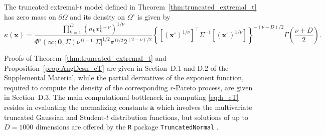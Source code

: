 \documentclass[12pt]{article}
\begin{document}
%
%
\begin{proposition}
\label{prop:AngDesn_eT}
The truncated extremal-$t$ model defined in Theorem~\ref{thm:truncated_extremal_t} has zero mass on $\partial\Omega$ and its density on $\Omega^\circ$ is given by
%
\begin{equation}
\label{eq:h_eT}
\kappa(\bm x) = \frac{\prod_{k=1}^D \left(a_k x_k^{1-\nu}\right)^{1/\nu}}{\Phi^\circ(\bm \infty;\bm 0, \Sigma) \nu^{D-1}|\Sigma|^{1/2}\pi^{D/2}2^{(2-\nu)/2}} \left\{\left[(\bm x^\circ)^{1/\nu}\right]^\top \Sigma^{-1}\left[(\bm x^\circ)^{1/\nu}\right]\right\}^{-(\nu+D)/2} \Gamma\left(\frac{\nu+D}{2}\right).
\end{equation}%
\end{proposition}

Proofs of Theorem~\ref{thm:truncated_extremal_t}  and Proposition~\ref{prop:AngDesn_eT} are given in Section~D.1 and D.2 of the Supplemental Material, while the partial derivatives of the exponent function, required to compute the density of the corresponding $r$-Pareto process, are given in Section~D.3.
The main computational bottleneck in computing \eqref{eq:h_eT} resides in evaluating the normalizing constants $\bm a$ which involves the multivariate truncated Gaussian and Student-$t$ distribution functions, but solutions of up to $D=1000$ dimensions are offered by the \texttt{R} package \texttt{TruncatedNormal} \citep{Botev.Belzile:2021}.   

\end{document}
